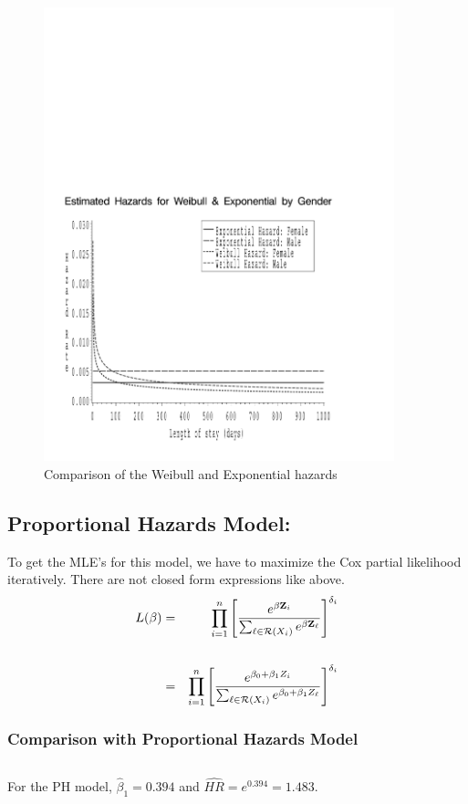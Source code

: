 \documentclass[11pt,psfig]{book}
\newcommand{\bfZ}{\mathbf{Z}}
\newcommand{\bfbeta}{\mathbf{\beta}}
\begin{document}
\begin{figure}[h!]
\caption{Comparison of the Weibull and Exponential hazards}
\centerline{\includegraphics[width=4in]{weibhaz.pdf}}
\end{figure}
\subsection{Proportional Hazards Model:}
To get the MLE's for this model, we have to maximize the Cox partial
likelihood iteratively.  There are not closed form expressions like above.
\begin{eqnarray*}
L(\bfbeta) & = & \prod_{i=1}^{n}
\left[ \frac {e^{\bfbeta {\bfZ}_i }} {\sum_{\ell \in {\cal R}(X_i)}
    e^{\bfbeta {\bfZ}_\ell}} \right]^{\delta_i}\\[4ex]
& = & \prod_{i=1}^{n}
\left[ \frac {e^{\beta_0 + \beta_1 Z_i }} {\sum_{\ell \in {\cal R}(X_i)}
    e^{\beta_0 + \beta_1 Z_\ell}} \right]^{\delta_i}
\end{eqnarray*}
\subsubsection{Comparison with Proportional Hazards Model}
\small
\begin{verbatim}
\end{verbatim}
\normalsize
For the PH model, $\hat\beta_1=0.394$ and $\widehat{HR}=e^{0.394}=1.483$.
\end{document}
